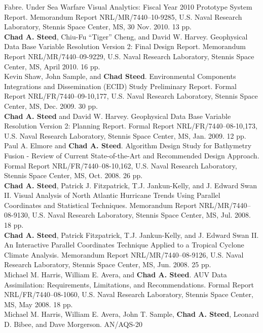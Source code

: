 \documentclass[11pt, letterpaper]{article}
\newcommand{\years}[1]{\marginnote{\scriptsize #1}}
\begin{document}
\begin{sloppypar}
Fabre. Under Sea Warfare Visual Analytics: Fiscal Year 2010 Prototype System
Report. Memorandum Report NRL/MR/7440--10-9285, U.S. Naval Research
Laboratory, Stennis Space Center, MS, 30 Nov. 2010. 13 pp.\\
\years{2010}\textbf{Chad A. Steed}, Chiu-Fu ``Tiger'' Cheng, and David W.
Harvey. Geophysical Data Base Variable Resolution Version 2: Final Design
Report. Memorandum Report NRL/MR/7440--09-9229, U.S. Naval Research
Laboratory, Stennis Space Center, MS, April 2010. 16 pp.\\
\years{2009}Kevin Shaw, John Sample, and \textbf{Chad Steed}. Environmental
Components Integrations and Dissemination (ECID) Study Preliminary Report.
Formal Report NRL/FR/7440--09-10,177, U.S. Naval Research Laboratory, Stennis
Space Center, MS, Dec. 2009. 30 pp.\\
\years{2009}\textbf{Chad A. Steed} and David W. Harvey. Geophysical Data Base
Variable Resolution Version 2: Planning Report. Formal Report
NRL/FR/7440–08-10,173, U.S. Naval Research Laboratory, Stennis Space Center,
MS, Jan. 2009. 12 pp.\\
\years{2008}Paul A. Elmore and \textbf{Chad A. Steed}. Algorithm Design Study
for Bathymetry Fusion - Review of Current State-of-the-Art and Recommended
Design Approach. Formal Report NRL/FR/7440–08-10,162, U.S. Naval Research
Laboratory, Stennis Space Center, MS, Oct. 2008. 26 pp.\\
\years{2008}\textbf{Chad A. Steed}, Patrick J. Fitzpatrick, T.J. Jankun-Kelly,
and J. Edward Swan II. Visual Analysis of North Atlantic Hurricane Trends
Using Parallel Coordinates and Statistical Techniques. Memorandum Report
NRL/MR/7440–08-9130, U.S. Naval Research Laboratory, Stennis Space Center,
MS, Jul. 2008. 18 pp.\\
\years{2008}\textbf{Chad A. Steed}, Patrick Fitzpatrick, T.J. Jankun-Kelly,
and J. Edward Swan II. An Interactive Parallel Coordinates Technique Applied
to a Tropical Cyclone Climate Analysis. Memorandum Report NRL/MR/7440–08-9126,
U.S. Naval Research Laboratory, Stennis Space Center, MS, Jun. 2008. 25 pp.\\
\years{2008}Michael M. Harris, William E. Avera, and \textbf{Chad A. Steed}.
AUV Data Assimilation: Requirements, Limitations, and Recommendations.
Formal Report NRL/FR/7440–08-1060, U.S. Naval Research Laboratory, Stennis
Space Center, MS, May 2008. 18 pp.\\
\years{2006}Michael M. Harris, William E. Avera, John T. Sample,
\textbf{Chad A. Steed}, Leonard D. Bibee, and Dave Morgerson. AN/AQS-20

\end{sloppypar}
\end{document}
